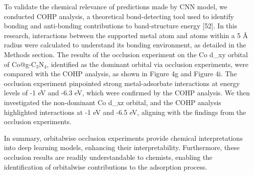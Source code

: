 To validate the chemical relevance of predictions made by CNN model, we conducted COHP analysis, a theoretical bond-detecting tool used to identify bonding and anti-bonding contributions to band-structure energy [52].
In this research, interactions between the supported metal atom and atoms within a 5 Å radius were calculated to understand its bonding environment, as detailed in the Methods section.
The results of the occlusion experiment on the Co d_xy orbital of Co@g-C$_3$N$_4$, identified as the dominant orbital via occlusion experiments, were compared with the COHP analysis, as shown in Figure 4g and Figure 4i.
The occlusion experiment pinpointed strong metal-adsorbate interactions at energy levels of -1 eV and -6.3 eV, which were confirmed by the COHP analysis.
We then investigated the non-dominant Co d_xz orbital, and the COHP analysis highlighted interactions at -1 eV and -6.5 eV, aligning with the findings from the occlusion experiments.

In summary, orbitalwise occlusion experiments provide chemical interpretations into deep learning models, enhancing their interpretability.
Furthermore, these occlusion results are readily understandable to chemists, enabling the identification of orbitalwise contributions to the adsorption process.
